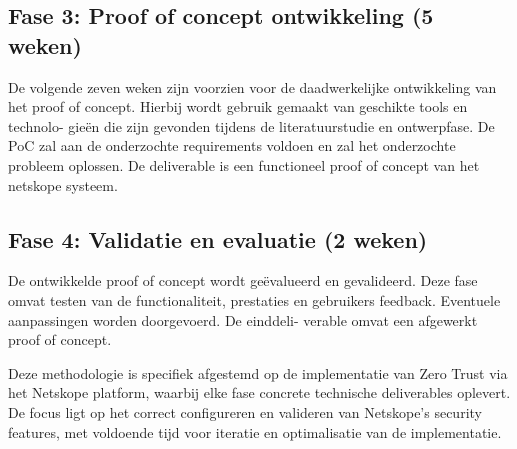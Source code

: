 \subsection{Fase 3: Proof of concept ontwikkeling (5 weken)}
De volgende zeven weken zijn voorzien voor de daadwerkelijke ontwikkeling van het
proof of concept. Hierbij wordt gebruik gemaakt van geschikte tools en technolo-
gieën die zijn gevonden tijdens de literatuurstudie en ontwerpfase. De PoC zal aan de onderzochte requirements voldoen en zal het onderzochte probleem oplossen. De deliverable is een functioneel proof of concept van het netskope systeem.

\subsection{Fase 4: Validatie en evaluatie (2 weken)}
De ontwikkelde proof of concept wordt geëvalueerd en gevalideerd. Deze fase omvat testen van de functionaliteit, prestaties en
gebruikers feedback. Eventuele aanpassingen worden doorgevoerd. De einddeli-
verable omvat een afgewerkt proof of concept.

Deze methodologie is specifiek afgestemd op de implementatie van Zero Trust via het Netskope platform, waarbij elke fase concrete technische deliverables oplevert. De focus ligt op het correct configureren en valideren van Netskope's security features, met voldoende tijd voor iteratie en optimalisatie van de implementatie.
